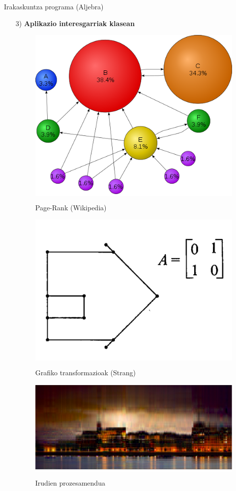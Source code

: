 \documentclass[
 10pt,%
 compress,%
 t,       %
 xcolor=svgnames
]{beamer}
\theoremstyle{definition} \newtheorem{definicion}{Definicion}[section]
\theoremstyle{propiedades} \newtheorem{propiedades}{Propiedades}[section]
\begin{document}
\begin{frame}{Irakaskuntza programa (Aljebra)}
\begin{itemize}
		
		\item[3)] \textbf{Aplikazio interesgarriak klasean}
		\begin{figure}
			\centering
			\begin{minipage}{.3\textwidth}
				\colorbox{white}  {\includegraphics[width=0.6\linewidth]{PageRanks-Example-svg.png}}  \centering \caption{\centering \tiny Page-Rank (Wikipedia)}	
			\end{minipage}
			\hfill
			\begin{minipage}{.3\textwidth}
				\colorbox{white}  {\includegraphics[width=0.8\linewidth]{Transformazio_linealak}}
				 \centering \caption{\centering \tiny Grafiko transformazioak (Strang)}
			\end{minipage}	
			\hfill
			\begin{minipage}{.3\textwidth}
				\colorbox{white}  {\includegraphics[width=0.8\linewidth]{IrudiKonprimitzea}}
		    	 \centering \caption{\centering \tiny Irudien prozesamendua}
			\end{minipage}
		\end{figure}
		

\end{itemize}
\end{frame}
\end{document}
